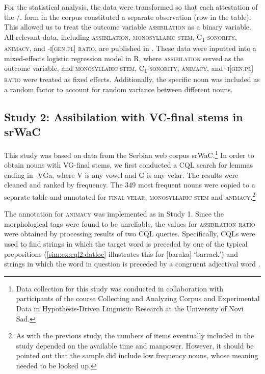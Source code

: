 \documentclass[output=paper,colorlinks,citecolor=brown]{langscibook}
\begin{document}
For the statistical analysis, the data were transformed so that each attestation of the {\DAT}/{\LOC.\SG} form in the corpus constituted a separate observation (row in the table). This allowed us to treat the outcome variable \textsc{assibilation} as a binary variable. All relevant data, including \textsc{assibilation}, \textsc{monosyllabic stem}, \textsc{C\textsubscript{1}-sonority}, \textsc{animacy}, and \textsc{\nobreakdash-i[gen.pl] ratio}, are published in \citet{Simonovic2024}. These data were inputted into a mixed-effects logistic regression model in R, where \textsc{assibilation} served as the outcome variable, and \textsc{monosyllabic stem}, \textsc{C\textsubscript{1}-sonority}, \textsc{animacy}, and \textsc{\nobreakdash-i[gen.pl] ratio} were treated as fixed effects. Additionally, the specific noun was included as a random factor to account for random variance between different nouns.

\subsection{Study 2: Assibilation with VC-final stems in srWaC}

This study was based on data from the Serbian web corpus srWaC.\footnote{Data collection for this study was conducted in collaboration with participants of the course Collecting and Analyzing Corpus and Experimental Data in Hypothesis-Driven Linguistic Research at the University of Novi Sad.} 
In order to obtain nouns with VG-final stems, we first conducted a CQL search for lemmas ending in -VGa, where V is any vowel and G is any velar. The results were cleaned and ranked by frequency. The 349 most frequent nouns were copied to a separate table and annotated for \textsc{final velar}, \textsc{monosyllabic stem} and \textsc{animacy}.\footnote{As with the previous study, the numbers of items eventually included in the study depended on the available time and manpower. However, it should be pointed out that the sample did include low frequency nouns, whose meaning needed to be looked up.}

The annotation for \textsc{animacy} was implemented as in Study 1. Since the morphological tags were found to be unreliable, the values for \textsc{assibilation ratio} were obtained by processing results of two CQL queries. Specifically, CQLs were used to find strings in which the target word is preceded by one of the typical prepositions (\ref{sim:ex:cql2:datloc} illustrates this for [{baraka}] `barrack') and strings in which the word in question is preceded by a congruent adjectival word .
\end{document}
